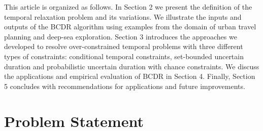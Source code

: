 \documentclass[jair,twoside,11pt,theapa]{article}
\begin{document}
This article is organized as follows. In Section 2 we present the definition of
the temporal relaxation problem and its variations. We illustrate the inputs and
outputs of the BCDR algorithm using examples from the domain of urban travel
planning and deep-sea exploration. Section 3 introduces the approaches we
developed to resolve over-constrained temporal problems with three different
types of constraints: conditional temporal constraints, set-bounded uncertain
duration and probabilistic uncertain duration with chance constraints. We
discuss the applications and empirical evaluation of BCDR in Section 4. Finally,
Section 5 concludes with recommendations for applications and future
improvements.


%
%
%


\section{Problem Statement}

%
%
%
%
\end{document}
